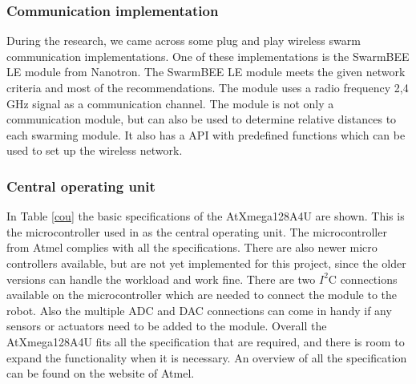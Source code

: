 \documentclass[10pt,a4paper]{article}
\begin{document}
\subsubsection{Communication implementation}
During the research, we came across some plug and play wireless swarm communication implementations. One of these implementations is the SwarmBEE LE module from Nanotron. The SwarmBEE LE module meets the given network criteria and most of the recommendations. The module uses a radio frequency 2,4 GHz signal as a communication channel. The module is not only a communication module, but can also be used to determine relative distances to each swarming module. It also has a API with predefined functions which can be used to set up the wireless network.



\subsubsection{Central operating unit}

In Table \ref{cou} the basic specifications of the AtXmega128A4U are shown. This is the microcontroller used in as the central operating unit. The microcontroller from Atmel complies with all the specifications. There are also newer micro controllers available, but are not yet implemented for this project, since the older versions can handle the workload and work fine. There are two $I^2$C connections available on the microcontroller which are needed to connect the module to the robot. Also the multiple ADC and DAC connections can come in handy if any sensors or actuators need to be added to the module. Overall the AtXmega128A4U fits all the specification that are required, and there is room to expand the functionality when it is necessary. An overview of all the specification can be found on the website of Atmel.
\end{document}
